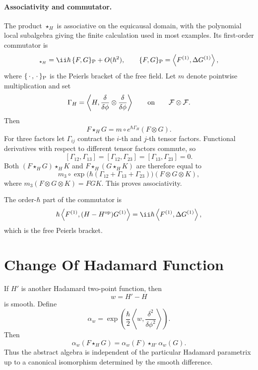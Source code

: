 \paragraph{Associativity and commutator.}
The product \(\star_H\) is associative on the equicausal domain, with the
polynomial local subalgebra giving the finite calculation used in most
examples.  Its first-order commutator is
\begin{equation}
  [F,G]_{\star_H}
  =
  \ii\hbar\,\{F,G\}_{\rm P}
  +O(\hbar^2),
  \qquad
  \{F,G\}_{\rm P}
  =
  \left\langle F^{(1)},\Delta G^{(1)}\right\rangle ,
  \label{eq:paqft-peierls-first-order}
\end{equation}
where \(\{\,\cdot\,,\,\cdot\,\}_{\rm P}\) is the Peierls bracket of the free
field.
Let \(m\) denote pointwise multiplication and set
\[
  \Gamma_H=\left\langle H,\frac{\delta}{\delta\phi}\otimes
  \frac{\delta}{\delta\phi}\right\rangle
  \qquad\hbox{on}\qquad
  \mathcal F\otimes\mathcal F .
\]
Then
\[
  F\star_HG=m\circ e^{\hbar\Gamma_H}(F\otimes G).
\]
For three factors let \(\Gamma_{ij}\) contract the \(i\)-th and \(j\)-th
tensor factors.  Functional derivatives with respect to different tensor
factors commute, so
\[
  [\Gamma_{12},\Gamma_{13}]
  =
  [\Gamma_{12},\Gamma_{23}]
  =
  [\Gamma_{13},\Gamma_{23}]
  =
  0 .
\]
Both \((F\star_HG)\star_HK\) and \(F\star_H(G\star_HK)\) are therefore equal
to
\[
  m_3\circ
  \exp\bigl(\hbar(\Gamma_{12}+\Gamma_{13}+\Gamma_{23})\bigr)
  (F\otimes G\otimes K),
\]
where \(m_3(F\otimes G\otimes K)=FGK\).  This proves associativity.

The order-\(\hbar\) part of the commutator is
\[
  \hbar\left\langle F^{(1)},(H-H^{\rm op})G^{(1)}\right\rangle
  =
  \ii\hbar\left\langle F^{(1)},\Delta G^{(1)}\right\rangle ,
\]
which is the free Peierls bracket.

\section{Change Of Hadamard Function}

\begin{proposition}
\label{prop:paqft-hadamard-change-isomorphism}
If \(H'\) is another Hadamard two-point function, then
\[
  w=H'-H
\]
is smooth.  Define
\[
  \alpha_w
  =
  \exp\!\left(
    \frac{\hbar}{2}
    \left\langle w,\frac{\delta^2}{\delta\phi^2}\right\rangle
  \right).
\]
Then
\begin{equation}
  \alpha_w(F\star_H G)=\alpha_w(F)\star_{H'}\alpha_w(G).
  \label{eq:paqft-hadamard-change-isomorphism}
\end{equation}
Thus the abstract algebra is independent of the particular Hadamard
parametrix up to a canonical isomorphism determined by the smooth difference.
\end{proposition}

